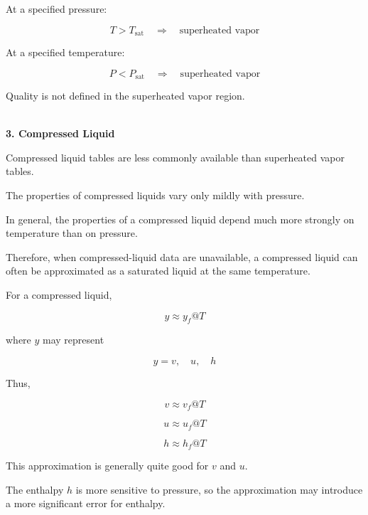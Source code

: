 \documentclass[12pt]{article}
\begin{document}
At a specified pressure:

\begin{equation*}
T>T_{\mathrm{sat}}
\quad\Rightarrow\quad
\text{superheated vapor}
\end{equation*}

At a specified temperature:

\begin{equation*}
P<P_{\mathrm{sat}}
\quad\Rightarrow\quad
\text{superheated vapor}
\end{equation*}

Quality is not defined in the superheated vapor region.

\textbf{\\ 3. Compressed Liquid}

Compressed liquid tables are less commonly available than superheated vapor tables.

The properties of compressed liquids vary only mildly with pressure.

In general, the properties of a compressed liquid depend much more strongly on temperature than on pressure.

Therefore, when compressed-liquid data are unavailable, a compressed liquid can often be approximated as a saturated liquid at the same temperature.

For a compressed liquid,

\begin{equation*}
\boxed{y\approx y_f@T}
\end{equation*}

where $y$ may represent

\begin{equation*}
y=v,\quad u,\quad h
\end{equation*}

Thus,

\begin{equation*}
\boxed{v\approx v_f@T}
\end{equation*}

\begin{equation*}
\boxed{u\approx u_f@T}
\end{equation*}

\begin{equation*}
\boxed{h\approx h_f@T}
\end{equation*}

This approximation is generally quite good for $v$ and $u$.

The enthalpy $h$ is more sensitive to pressure, so the approximation may introduce a more significant error for enthalpy.
\end{document}
